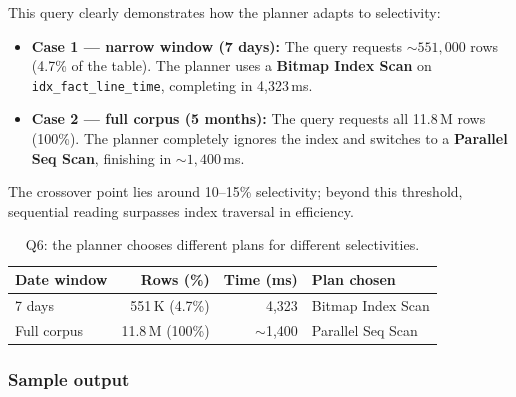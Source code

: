 \documentclass[a4paper,11pt]{article}
\begin{document}
This query clearly demonstrates how the planner adapts to selectivity:
\begin{itemize}
  \item \textbf{Case 1 --- narrow window (7 days):} The query requests
    ${\sim}551{,}000$ rows (4.7\% of the table). The planner uses a
    \textbf{Bitmap Index Scan} on \texttt{idx\_fact\_line\_time},
    completing in 4,323\,ms.
  \item \textbf{Case 2 --- full corpus (5 months):} The query requests all
    11.8\,M rows (100\%). The planner completely ignores the index and switches
    to a \textbf{Parallel Seq Scan}, finishing in ${\sim}1{,}400$\,ms.
\end{itemize}
The crossover point lies around 10--15\% selectivity; beyond this threshold,
sequential reading surpasses index traversal in efficiency.

\begin{table}[H]
\centering
\begin{tabular}{lrrl}
\toprule
\textbf{Date window} & \textbf{Rows (\%)} & \textbf{Time (ms)} &
  \textbf{Plan chosen} \\
\midrule
7 days      & 551\,K (4.7\%)  & 4,323        & Bitmap Index Scan \\
Full corpus & 11.8\,M (100\%) & ${\sim}$1,400 & Parallel Seq Scan \\
\bottomrule
\end{tabular}
\caption{Q6: the planner chooses different plans for different selectivities.}
\label{tab:q6-plans}
\end{table}

\subsubsection{Sample output}

\begin{table}[H]
\centering
\small
{}%
\caption{Q6 sample output for the 7-day window 2026-03-01 to 2026-03-08, ordered by average lateness.}
\end{table}
\end{document}
